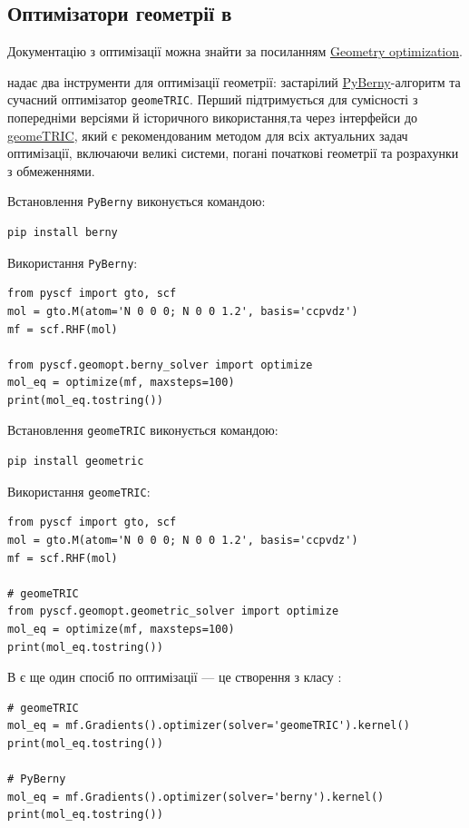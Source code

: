 \subsection{Оптимізатори геометрії в \PySCF}

Документацію \PySCF{} з оптимізації можна знайти за посиланням \href{https://pyscf.org/user/geomopt.html}{Geometry optimization}.


\PySCF{} надає два інструменти для оптимізації геометрії: застарілий \href{https://github.com/jhrmnn/pyberny}{PyBerny}-алгоритм та сучасний оптимізатор \texttt{geomeTRIC}. Перший підтримується для сумісності з попередніми версіями й історичного використання,та через інтерфейси до \href{https://github.com/leeping/geomeTRIC}{geomeTRIC}, який є рекомендованим методом для всіх актуальних задач оптимізації, включаючи великі системи, погані початкові геометрії та розрахунки з обмеженнями.

Встановлення \texttt{PyBerny} виконується командою:
\begin{verbatim}
pip install berny
\end{verbatim}

Використання \texttt{PyBerny}:
\begin{verbatim}
from pyscf import gto, scf
mol = gto.M(atom='N 0 0 0; N 0 0 1.2', basis='ccpvdz')
mf = scf.RHF(mol)

from pyscf.geomopt.berny_solver import optimize
mol_eq = optimize(mf, maxsteps=100)
print(mol_eq.tostring())
\end{verbatim}

Встановлення \texttt{geomeTRIC} виконується командою:
\begin{verbatim}
pip install geometric
\end{verbatim}


Використання \texttt{geomeTRIC}:
\begin{verbatim}
from pyscf import gto, scf
mol = gto.M(atom='N 0 0 0; N 0 0 1.2', basis='ccpvdz')
mf = scf.RHF(mol)

# geomeTRIC
from pyscf.geomopt.geometric_solver import optimize
mol_eq = optimize(mf, maxsteps=100)
print(mol_eq.tostring())
\end{verbatim}

В \PySCF{} є ще один спосіб по оптимізації --- це створення  з класу :

\begin{verbatim}
# geomeTRIC
mol_eq = mf.Gradients().optimizer(solver='geomeTRIC').kernel()
print(mol_eq.tostring())

# PyBerny
mol_eq = mf.Gradients().optimizer(solver='berny').kernel()
print(mol_eq.tostring())
\end{verbatim}

